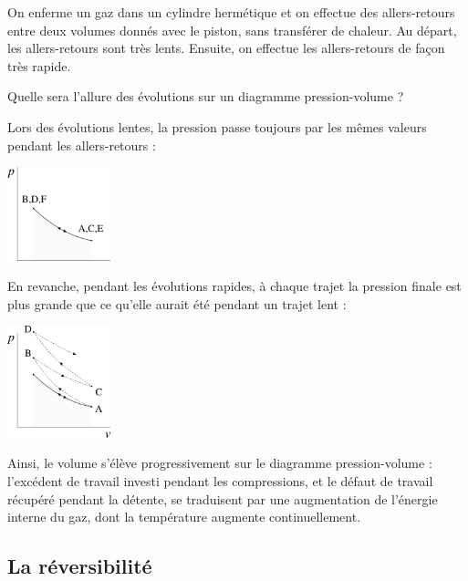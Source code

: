 			
			\begin{anexample}
				On enferme un gaz dans un cylindre hermétique et on effectue des allers-retours entre deux volumes donnés avec le piston, sans transférer de chaleur. Au départ, les allers-retours sont très lents. Ensuite, on effectue les allers-retours de façon très rapide.
				
				Quelle sera l’allure des évolutions sur un diagramme pression-volume ?
					\begin{answer}
						Lors des évolutions lentes, la pression passe toujours par les mêmes valeurs pendant les allers-retours :
							\begin{center}
								\includegraphics[width=3cm]{images/exe_pv_rev.png}
							\end{center}
						En revanche, pendant les évolutions rapides, à chaque trajet la pression finale est plus grande que ce qu’elle aurait été pendant un trajet lent :
							\begin{center}
								\includegraphics[width=3cm]{images/exe_pv_irr.png}
							\end{center}
						Ainsi, le volume s’élève progressivement sur le diagramme pression-volume : l’excédent de travail investi pendant les compressions, et le défaut de travail récupéré pendant la détente, se traduisent par une augmentation de l’énergie interne du gaz, dont la température augmente continuellement.
					\end{answer}
			\end{anexample}

\onlyframabook{\clearpage}%
	\subsection{La réversibilité}
	\label{ch_reversibilite}
	
